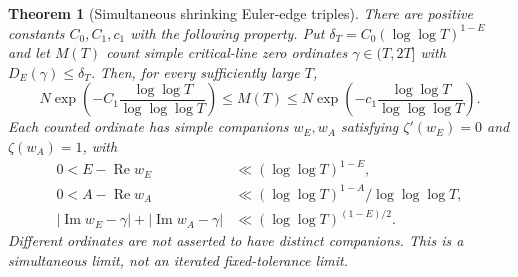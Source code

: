 \documentclass[11pt,letterpaper]{article}
\newtheorem{theorem}{Theorem}[section]
\theoremstyle{definition}
\theoremstyle{remark}
\renewcommand{\Re}{\operatorname{Re}}
\renewcommand{\Im}{\operatorname{Im}}
\newcommand{\1}{\mathbf 1}
\begin{document}
\begin{theorem}[Simultaneous shrinking Euler-edge triples]
\label{p04:thm:simultaneous-triples}
There are positive constants $C_0,C_1,c_1$ with the following
property. Put $\delta_T=C_0(\log\log T)^{1-E}$ and let $M(T)$
count simple critical-line zero ordinates $\gamma\in(T,2T]$
with $D_E(\gamma)\le\delta_T$. Then, for every sufficiently large $T$,
\begin{equation}\label{p04:eq:simultaneous-rarity}
 N\exp\!\left(-C_1\frac{\log\log T}{\log\log\log T}\right)
 \le M(T)\le
 N\exp\!\left(-c_1\frac{\log\log T}{\log\log\log T}\right).
\end{equation}
Each counted ordinate has simple companions $w_E,w_A$ satisfying
$\zeta'(w_E)=0$ and $\zeta(w_A)=1$, with
\begin{align*}
 0<E-\Re w_E&\ll(\log\log T)^{1-E},\\
 0<A-\Re w_A&\ll
       (\log\log T)^{1-A}/\log\log\log T,\\
 |\Im w_E-\gamma|+|\Im w_A-\gamma|
       &\ll(\log\log T)^{(1-E)/2}.
\end{align*}
Different ordinates are not asserted to have distinct companions.
This is a simultaneous limit, not an iterated fixed-tolerance limit.
\end{theorem}
\end{document}
